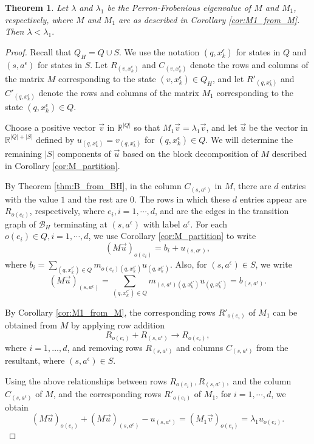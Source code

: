 \documentclass{article}
\newtheorem{mythm}{Theorem}[section]
\newcommand{\B}{\mathcal{B}}
\newcommand{\e}{\epsilon}
\begin{document}
    \begin{mythm} \label{thm:main_lambda<lambda1}
        Let $\lambda$ and $\lambda_1$ be the Perron-Frobenious eigenvalue of $M$ and $M_1$, respectively, where $M$ and $M_1$ are as described in Corollary \ref{cor:M1_from_M}. 
        Then $ \lambda < \lambda_1.$
    \end{mythm}
    \begin{proof} 
    Recall that $Q_H = Q \cup S$. We use the notation $(q, x_k^{\e})$ for states in $Q$ and $(s, a^{\e})$ for states in $S$. Let $R_{(v, x_k^{\e})}$ and $C_{(v, x_k^{\e})}$ denote the rows and columns of the matrix $M$ corresponding to the state $(v, x_k^{\e}) \in Q_H$, and let $R'_{(q, x_k^{\e})}$ and $C'_{(q, x_k^{\e})}$ denote the rows and columns of the matrix $M_1$ corresponding to the state $(q, x_k^{\e}) \in Q$.

    Choose a positive vector $\overrightarrow{v}$ in $\mathbb{R}^{|Q|}$ so that $M_1\overrightarrow{v} = \lambda_1\overrightarrow{v}$, and let $\overrightarrow{u}$ be the vector in $\mathbb{R}^{|Q|+|S|}$ defined by $u_{(q,x_k^{\e})} = v_{(q,x_k^{\e})}$ for ${(q,x_k^{\e})} \in Q$. We will determine the remaining $|S|$ components of $\overrightarrow{u}$ based on the block decomposition of $M$ described in Corollary  \ref{cor:M_partition}.
    
    By Theorem \ref{thm:B_from_BH}, in the column $C_{(s,a^{\e})}$ in $M$, there are $d$ entries with the value $1$ and the rest are $0$. The rows in which these $d$ entries appear are $R_{o(e_i)}$, respectively, where $e_i, i = 1,\cdots,d$, and are the edges in the transition graph of $\B_H$ terminating at $(s,a^{\e})$ with label $a^{\e}.$ For each $o(e_i) \in Q, i = 1,\cdots,d$, we use Corollary \ref{cor:M_partition} to write 
     $$(M \overrightarrow{u})_{o(e_i)} = b_i + u_{(s,a^{\e})},$$  
     where $b_i = \displaystyle \sum_{(q,x_k^{\e'}) \in Q} m_{o(e_i)(q,x_k^{\e'})} u_{(q,x_k^{\e'})}.$ Also, for $(s,a^{\e}) \in S$, we write 
     $$(M \overrightarrow{u})_{(s,a^{\e})} = \sum_{(q,x_k^{\e'}) \in Q} m_{(s,a^{\e})(q,x_k^{\e'})} u_{(q,x_k^{\e'})} = b_{(s,a^{\e})}.$$
     
    By Corollary \ref{cor:M1_from_M}, the corresponding rows $R'_{o(e_i)}$ of $M_1$ can be obtained from $M$ by applying row addition 
    $$R_{o(e_i)} + R_{(s,a^{\e})} \rightarrow R_{o(e_i)},$$ 
    where $i = 1, \dots, d$, and removing rows $R_{(s,a^{\e})}$ and columns $C_{(s,a^{\e})}$ from the resultant, where $(s,a^{\e}) \in S$. 

    Using the above relationships between rows $R_{o(e_i)}, R_{(s,a^{\e})},$ and the column $C_{(s,a^{\e})}$ of $M$, and the corresponding rows $R'_{o(e_i)}$ of $M_1$, for $i = 1,\cdots,d$, we obtain
    $$(M \overrightarrow{u})_{o(e_i)} + (M \overrightarrow{u})_{(s,a^{\e})} - u_{(s,a^{\e})} = (M_1 \overrightarrow{v})_{o(e_i)} = \lambda_1 u_{o(e_i)}.$$


\end{proof}
\end{document}
